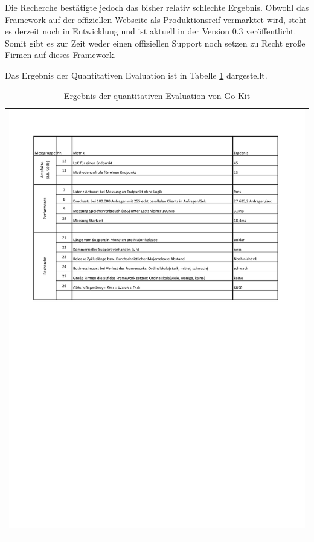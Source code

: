 Die Recherche bestätigte jedoch das bisher relativ schlechte Ergebnis. Obwohl das Framework auf der offiziellen Webseite als Produktionsreif vermarktet wird\cite{GoKitFAQ2017}, steht es derzeit noch in Entwicklung und ist aktuell in der Version $0.3$ veröffentlicht. Somit gibt es zur Zeit weder einen offiziellen Support noch setzen zu Recht große Firmen auf dieses Framework.

Das Ergebnis der Quantitativen Evaluation ist in Tabelle \ref{QuantErgebnisGokit} dargestellt.  

\begin{longtable}{c}
	\includegraphics[width=\linewidth]{Bilder/ObjekEvalErgebnisGokit.pdf} \\	
	\caption[Quantitative Evaluation Ergebnis Go-Kit]{Ergebnis der quantitativen Evaluation von Go-Kit}
	\label{QuantErgebnisGokit}\\
\end{longtable}
\FloatBarrier

